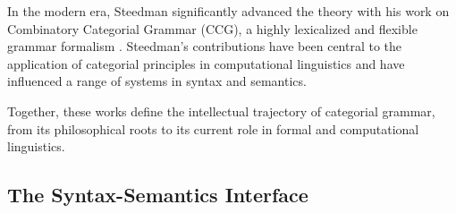 In the modern era, Steedman significantly advanced the theory with his work on Combinatory Categorial Grammar (CCG), a highly lexicalized and flexible grammar formalism \cite{steedman1996surface}. Steedman's contributions have been central to the application of categorial principles in computational linguistics and have influenced a range of systems in syntax and semantics.

Together, these works define the intellectual trajectory of categorial grammar, from its philosophical roots to its current role in formal and computational linguistics.

\subsection{The Syntax-Semantics Interface}
